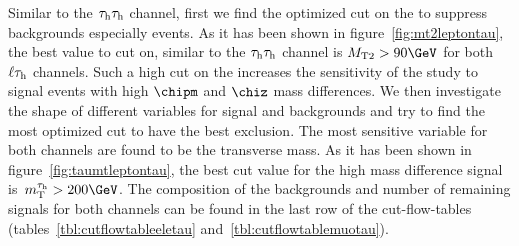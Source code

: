 Similar to the $\tau_{\rm h}\tau_{\rm h}$ channel, first we find the optimized cut on the \mttwo to suppress backgrounds especially \wjets events. As it has been shown in figure~\ref{fig:mt2leptontau}, the best value to cut on, similar to the $\tau_{\rm h}\tau_{\rm h}$ channel is $\mttwo > 90 \GeV$ for both $\ell\tau_{\rm h}$ channels. Such a high cut on the \mttwo increases the sensitivity of the study to signal events with high $\chipm$ and $\chiz$ mass differences. We then investigate the shape of different variables for signal and backgrounds and try to find the most optimized cut to have the best exclusion. The most sensitive variable for both channels are found to be the \Tau transverse mass. As it has been shown in figure~\ref{fig:taumtleptontau}, the best cut value for the high mass difference signal is $\tauMT > 200 \GeV$. The composition of the backgrounds and number of remaining signals for both channels can be found in the last row of the cut-flow-tables (tables~\ref{tbl:cutflowtableeletau} and~\ref{tbl:cutflowtablemuotau}).

